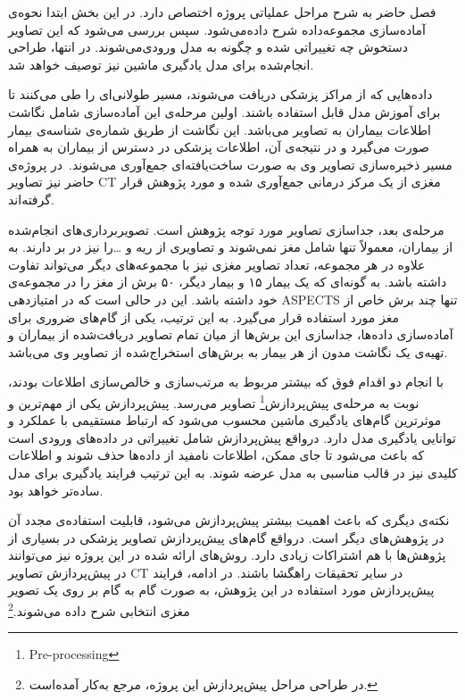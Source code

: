 

فصل حاضر به شرح مراحل عملیاتی پروژه اختصاص دارد.
در این بخش ابتدا نحوه‌ی آماده‌سازی مجموعه‌داده شرح داده‌می‌شود.
سپس بررسی می‌شود که این تصاویر دستخوش چه تغییراتی شده و چگونه به مدل ورودی‌می‌شوند.
در انتها، طراحی انجام‌شده برای مدل یادگیری ماشین نیز توصیف خواهد شد.


داده‌هایی که از مراکز پزشکی دریافت می‌شوند، مسیر طولانی‌ای را طی می‌کنند تا برای آموزش مدل قابل استفاده باشند.
اولین مرحله‌ی این آماده‌سازی شامل نگاشت اطلاعات بیماران به تصاویر می‌باشد.
این نگاشت از طریق شماره‌ی شناسه‌ی بیمار صورت می‌گیرد 
و در نتیجه‌ی آن، اطلاعات پزشکی در دسترس از بیماران به همراه مسیر ذخیره‌سازی تصاویر وی به صورت ساخت‌یافته‌ای جمع‌آوری می‌شوند.\
در پروژه‌ی حاضر نیز تصاویر CT مغزی از یک مرکز درمانی جمع‌آوری شده و مورد پژوهش قرار گرفته‌اند.

مرحله‌ی بعد، جداسازی تصاویر مورد توجه پژوهش است.
تصویربرداری‌های انجام‌شده از بیماران، معمولاً تنها شامل مغز نمی‌شوند و تصاویری از ریه و \dots را نیز در بر دارند.
به علاوه در هر مجموعه، تعداد تصاویر مغزی نیز با مجموعه‌های دیگر می‌تواند تفاوت داشته باشد.
به گونه‌ای که یک بیمار ۱۵ و بیمار دیگر، ۵۰ برش از مغز را در مجموعه‌ی خود داشته باشد.
این در حالی است که در امتیازدهی ASPECTS تنها چند برش خاص از مغز مورد استفاده قرار می‌گیرد.
به این ترتیب، یکی از گام‌های ضروری برای آماده‌سازی داده‌ها، جداسازی این برش‌ها از میان تمام 
تصاویر دریافت‌شده از بیماران و تهیه‌ی یک نگاشت مدون از هر بیمار به برش‌های استخراج‌شده از تصاویر وی می‌باشد.

با انجام دو اقدام فوق که بیشتر مربوط به مرتب‌سازی و خالص‌سازی اطلاعات بودند، نوبت به مرحله‌ی 
پیش‌پردازش\footnote{Pre-processing}
تصاویر می‌رسد.
پیش‌پردازش یکی از مهم‌ترین و موثرترین گام‌های یادگیری ماشین محسوب می‌شود که ارتباط مستقیمی با عملکرد و توانایی یادگیری مدل دارد. 
درواقع پیش‌پردازش شامل تغییراتی در داده‌های ورودی است که باعث می‌شود تا جای ممکن، اطلاعات نامفید از داد‌ه‌ها حذف شوند و اطلاعات کلیدی نیز در قالب مناسبی به مدل عرضه شوند.
به این ترتیب فرایند یادگیری برای مدل ساده‌تر خواهد بود.

نکته‌ی دیگری که باعث اهمیت بیشتر پیش‌پردازش می‌شود، قابلیت استفاده‌ی مجدد آن در پژوهش‌های دیگر است.
درواقع گام‌های پیش‌پردازش تصاویر پزشکی در بسیاری از پژوهش‌ها با هم اشتراکات زیادی دارد.
روش‌های ارائه شده در این پروژه نیز می‌توانند در پیش‌پردازش تصاویر CT در سایر تحقیقات راهگشا باشند.
در ادامه، فرایند پیش‌پردازش مورد استفاده در این پژوهش، به صورت گام به گام بر روی یک تصویر مغزی انتخابی شرح داده می‌شوند.\footnote{در طراحی مراحل پیش‌پردازش این پروژه، مرجع \cite{ma2020medical} به‌کار آمده‌است.}

